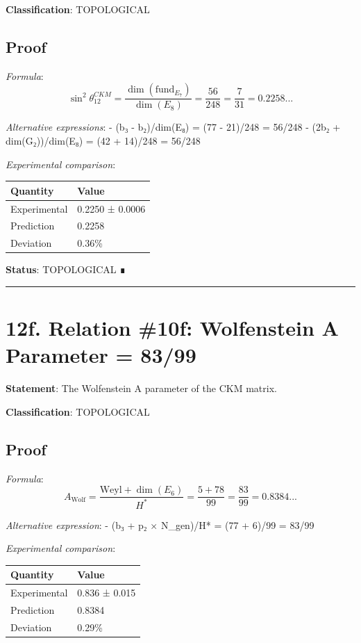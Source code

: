 \documentclass[11pt,a4paper]{article}
\begin{document}
\textbf{Classification}: TOPOLOGICAL

\subsection{Proof}\label{proof-12}

\emph{Formula}: \[\sin^2\theta_{12}^{CKM} = \frac{\dim(\text{fund}_{E_7})}{\dim(E_8)} = \frac{56}{248} = \frac{7}{31} = 0.2258...\]

\emph{Alternative expressions}: - (b₃ - b₂)/dim(E₈) = (77 - 21)/248 = 56/248 - (2b₂ + dim(G₂))/dim(E₈) = (42 + 14)/248 = 56/248

\emph{Experimental comparison}:

\begin{longtable}[]{@{}ll@{}}
\toprule\noalign{}
Quantity & Value \\
\midrule\noalign{}
\endhead
\bottomrule\noalign{}
\endlastfoot
Experimental & 0.2250 ± 0.0006 \\
Prediction & 0.2258 \\
Deviation & 0.36\% \\
\end{longtable}

\textbf{Status}: TOPOLOGICAL ∎

\begin{center}\rule{\linewidth}{0.5pt}\end{center}

\section{12f. Relation \#10f: Wolfenstein A Parameter = 83/99}\label{f.-relation-10f-wolfenstein-a-parameter-8399}

\textbf{Statement}: The Wolfenstein A parameter of the CKM matrix.

\textbf{Classification}: TOPOLOGICAL

\subsection{Proof}\label{proof-13}

\emph{Formula}: \[A_{\text{Wolf}} = \frac{\text{Weyl} + \dim(E_6)}{H^*} = \frac{5 + 78}{99} = \frac{83}{99} = 0.8384...\]

\emph{Alternative expression}: - (b₃ + p₂ × N\_\allowbreak{}gen)/H* = (77 + 6)/99 = 83/99

\emph{Experimental comparison}:

\begin{longtable}[]{@{}ll@{}}
\toprule\noalign{}
Quantity & Value \\
\midrule\noalign{}
\endhead
\bottomrule\noalign{}
\endlastfoot
Experimental & 0.836 ± 0.015 \\
Prediction & 0.8384 \\
Deviation & 0.29\% \\
\end{longtable}
\end{document}
